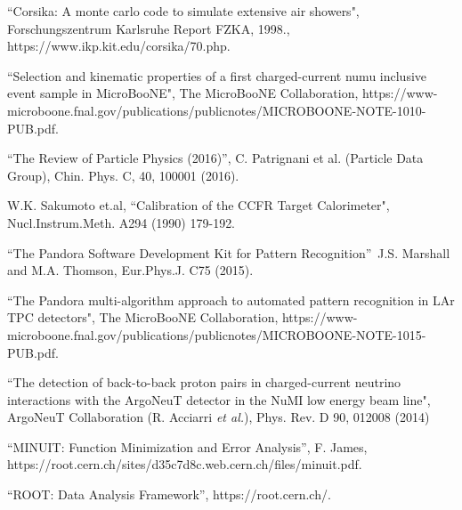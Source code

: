 \documentclass{article}
\begin{document}
\begin{thebibliography}{99}
 ``Corsika: A monte carlo code to simulate extensive air
showers", Forschungszentrum Karlsruhe Report FZKA, 1998.,
https://www.ikp.kit.edu/corsika/70.php.

 ``Selection and kinematic properties of a
first charged-current numu inclusive event sample in MicroBooNE", The
MicroBooNE Collaboration, \newline
https://www-microboone.fnal.gov/publications/publicnotes/MICROBOONE-NOTE-1010-PUB.pdf.

 ``The Review of Particle Physics (2016)'', C. Patrignani et al. (Particle Data Group), Chin. Phys. C, 40, 100001 (2016).

 W.K. Sakumoto et.al, ``Calibration of the CCFR Target
Calorimeter", Nucl.Instrum.Meth. A294 (1990) 179-192.

 \textquotedblleft The Pandora Software
Development Kit for Pattern Recognition\textquotedblright\ J.S. Marshall and M.A. Thomson, Eur.Phys.J. C75 (2015).

 ``The Pandora multi-algorithm approach to
automated pattern recognition in LAr TPC detectors", The MicroBooNE
Collaboration, \newline
https://www-microboone.fnal.gov/publications/publicnotes/MICROBOONE-NOTE-1015-PUB.pdf.

 ``The detection of back-to-back proton pairs in
charged-current neutrino interactions with the ArgoNeuT detector in the NuMI
low energy beam line", ArgoNeuT Collaboration (R. Acciarri \textit{et al.}),
Phys. Rev. D 90, 012008 (2014)

 ``MINUIT: Function Minimization and Error Analysis'', F. James,  \newline
https://root.cern.ch/sites/d35c7d8c.web.cern.ch/files/minuit.pdf.

 ``ROOT: Data Analysis Framework'', \newline
https://root.cern.ch/.

\end{thebibliography}
\end{document}
